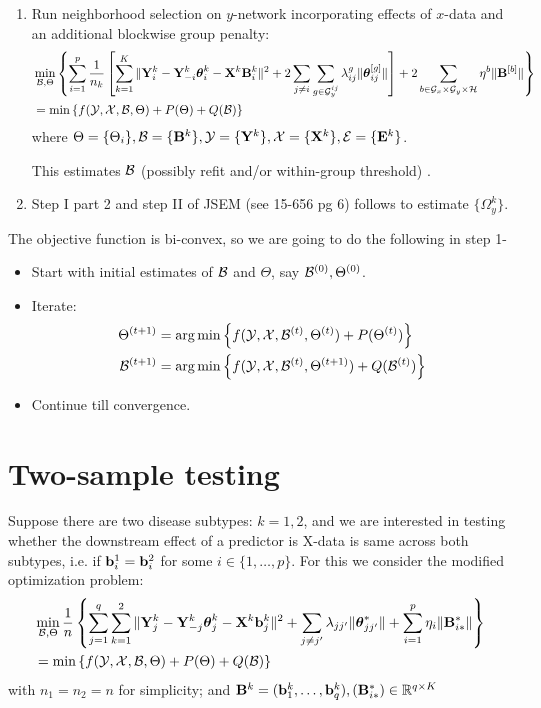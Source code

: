 \documentclass[fleqn,11pt]{article}
\DeclareMathOperator*{\argmin}{arg\,min}
\numberwithin{equation}{section}
\begin{document}
\begin{enumerate}
\item Run neighborhood selection on $y$-network incorporating effects of $x$-data and an additional blockwise group penalty:
%
\begin{align}
& \min_{{\cal{B}}, \Theta} \left\{ \sum_{i=1}^p  \frac{1}{n_k} \left[ \sum_{k=1}^K \| {\mathbf{Y}}^k_i - {\mathbf{Y}}_{-i}^k {\boldsymbol{\theta}}_i^k - {\mathbf{X}}^k {\mathbf{B}}_i^k \|^2 + 2 \sum_{j \neq i} \sum_{g \in {\cal{G}}_y^{ij}} \lambda_{ij}^g \| {\boldsymbol{\theta}}_{ij}^{[g]} \| \right] + 2 \sum_{b \in {\cal{G}}_x \times {\cal{G}}_y \times {\cal{H}}} \eta^b \| {\mathbf{B}}^{[b]} \| \right\}\\
&= \min \left\{ f ( {\cal{Y}}, {\cal{X}}, {\cal{B}}, \Theta) + P (\Theta) + Q ({\cal{B}}) \right\} 
\end{align}
%
where $\Theta = \{ \Theta_i \}, {\cal{B}} = \{ {\mathbf{B}}^k \}, {\cal{Y}} = \{ {\mathbf{Y}}^k \}, {\cal{X}} = \{ {\mathbf{X}}^k \}, {\cal{E}} = \{ {\mathbf{E}}^k \}$.

This estimates ${\cal{B}}$ { \colrbf (possibly refit and/or within-group threshold) }.

\item Step I part 2 and step II of JSEM (see 15-656 pg 6) follows to estimate $\{ \Omega_y^k \}$.
\end{enumerate}

The objective function is bi-convex, so we are going to do the following in step 1-

\begin{itemize}
\item Start with initial estimates of ${\cal{B}}$ and $\Theta$, say ${\cal{B}}^{(0)}, \Theta^{(0)}$.
\item Iterate:
%
\begin{align}
\Theta^{(t+1)} &= \argmin \left\{ f ( \cY, \cX, \cB^{(t)}, \Theta^{(t)}) + P (\Theta^{(t)}) \right\}\\
\cB^{(t+1)} &= \argmin \left\{ f ( \cY, \cX, \cB^{(t)}, \Theta^{(t+1)}) + Q (\cB^{(t)}) \right\}
\end{align}
\item Continue till convergence.
\end{itemize}
%

\section{Two-sample testing}
Suppose there are two disease subtypes: $k = 1,2$, and we are interested in testing whether the downstream effect of a predictor is X-data is same across both subtypes, i.e. if ${\bf{b}}_i^1 = {\bf{b}}_i^2$ for some $i \in \{ 1, \ldots, p \}$. For this we consider the modified optimization problem:
%
\begin{align}
& \min_{{\cal{B}}, \Theta} \frac{1}{n} \left\{ \sum_{j=1}^q \sum_{k=1}^2 \| {\mathbf{Y}}_j^k - {\mathbf{Y}}_{-j}^k {\boldsymbol{\theta}}_j^k - {\mathbf{X}}^k {\bf{b}}_{j}^k \|^2 + \sum_{j \neq j'} \lambda_{jj'} \| {\boldsymbol{\theta}}_{jj'}^* \| + \sum_{i=1}^p \eta_i \| {\mathbf{B}}_{i*}^* \| \right\}\\
&= \min \left\{ f ( {\cal{Y}}, {\cal{X}}, {\cal{B}}, \Theta) + P (\Theta) + Q ({\cal{B}}) \right\} 
\end{align}
%
with $n_1 = n_2 = n$ for simplicity; and ${\mathbf{B}}^k = ({\bf{b}}_1^k, \ldots, {\bf{b}}_q^k), ({\mathbf{B}}_{i*}^*) \in {\mathbb{R}}^{ q \times K}$
\end{document}
